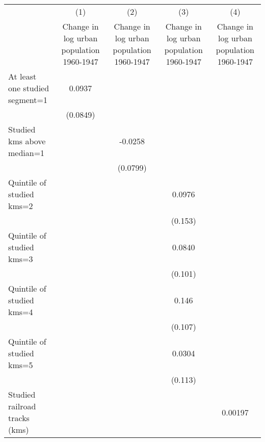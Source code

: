 {
\def\sym#1{\ifmmode^{#1}\else\(^{#1}\)\fi}
\begin{tabular}{l*{4}{c}}
\hline\hline
                    &\multicolumn{1}{c}{(1)}&\multicolumn{1}{c}{(2)}&\multicolumn{1}{c}{(3)}&\multicolumn{1}{c}{(4)}\\
                    &\multicolumn{1}{c}{Change in log urban population 1960-1947}&\multicolumn{1}{c}{Change in log urban population 1960-1947}&\multicolumn{1}{c}{Change in log urban population 1960-1947}&\multicolumn{1}{c}{Change in log urban population 1960-1947}\\
\hline
At least one studied segment=1&      0.0937         &                     &                     &                     \\
                    &    (0.0849)         &                     &                     &                     \\
[1em]
Studied kms above median=1&                     &     -0.0258         &                     &                     \\
                    &                     &    (0.0799)         &                     &                     \\
[1em]
Quintile of studied kms=2&                     &                     &      0.0976         &                     \\
                    &                     &                     &     (0.153)         &                     \\
[1em]
Quintile of studied kms=3&                     &                     &      0.0840         &                     \\
                    &                     &                     &     (0.101)         &                     \\
[1em]
Quintile of studied kms=4&                     &                     &       0.146         &                     \\
                    &                     &                     &     (0.107)         &                     \\
[1em]
Quintile of studied kms=5&                     &                     &      0.0304         &                     \\
                    &                     &                     &     (0.113)         &                     \\
[1em]
Studied railroad tracks (kms)&                     &                     &                     &     0.00197         \\

\end{tabular}}
